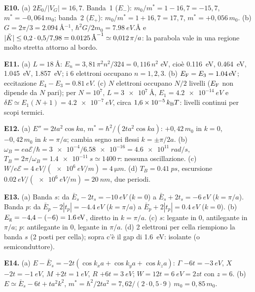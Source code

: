 \documentclass[11pt,a4paper]{article}
\begin{document}
\smallskip\noindent\textbf{E10.} (a) $2E_0/|V_G|=16{,}7$. Banda~1 ($E_-$): $m_0/m^*=1-16{,}7=-15{,}7$, $m^*=-0{,}064\,m_0$; banda~2 ($E_+$): $m_0/m^*=1+16{,}7=17{,}7$, $m^*=+0{,}056\,m_0$. (b) $G=2\pi/3=\SI{2.094}{\angstrom^{-1}}$, $\hbar^2G/2m_0=\SI{7.98}{eV.\angstrom}$ e $|\tilde K|\le0{,}2\cdot0{,}5/7{,}98=\SI{0.0125}{\angstrom^{-1}}\simeq0{,}012\,\pi/a$: la parabola vale in una regione molto stretta attorno al bordo.

\smallskip\noindent\textbf{E11.} (a) $L=\SI{18}{\angstrom}$: $E_n=3{,}81\,\pi^2n^2/324=0{,}116\,n^2$ eV, cioè \SI{0.116}{eV}, \SI{0.464}{eV}, \SI{1.045}{eV}, \SI{1.857}{eV}; i 6 elettroni occupano $n=1,2,3$. (b) $E_{\mathrm F}=E_3=\SI{1.04}{eV}$; eccitazione $E_4-E_3=\SI{0.81}{eV}$. (c) $N$ elettroni occupano $N/2$ livelli ($E_{\mathrm F}$ non dipende da $N$ pari); per $N=10^7$, $L=\SI{3e7}{\angstrom}$, $E_1=\SI{4.2e-14}{eV}$ e $\delta E\simeq E_1(N+1)=\SI{4.2e-7}{eV}$, circa $1{,}6\times10^{-5}\,k_{\mathrm B} T$: livelli continui per scopi termici.

\smallskip\noindent\textbf{E12.} (a) $E''=2ta^2\cos ka$, $m^*=\hbar^2/(2ta^2\cos ka)$: $+0{,}42\,m_0$ in $k=0$, $-0{,}42\,m_0$ in $k=\pi/a$; cambia segno nei flessi $k=\pm\pi/2a$. (b) $\omega_B=ea\mathcal E/\hbar=\num{3e-4}/\num{6.58e-16}=\SI{4.6e11}{rad/s}$, $T_B=2\pi/\omega_B=\SI{1.4e-11}{s}\simeq1400\,\tau$: nessuna oscillazione. (c) $W/e\mathcal E=\SI{4}{eV}/(\SI{e6}{eV/m})=\SI{4}{\micro m}$. (d) $T_B=\SI{0.41}{ps}$, escursione $\SI{0.02}{eV}/(\SI{e6}{eV/m})=\SI{20}{nm}$, due periodi.

\smallskip\noindent\textbf{E13.} (a) Banda $s$: da $\bar E_s-2t_s=\SI{-10}{eV}$ ($k=0$) a $\bar E_s+2t_s=\SI{-6}{eV}$ ($k=\pi/a$). Banda $p$: da $\bar E_p-2|t_p|=\SI{-4.4}{eV}$ ($k=\pi/a$) a $\bar E_p+2|t_p|=\SI{+0.4}{eV}$ ($k=0$). (b) $E_{\mathrm g}=-4{,}4-(-6)=\SI{1.6}{eV}$, diretto in $k=\pi/a$. (c) $s$: legante in $0$, antilegante in $\pi/a$; $p$: antilegante in $0$, legante in $\pi/a$. (d) 2 elettroni per cella riempiono la banda $s$ (2 posti per cella); sopra c'è il gap di \SI{1.6}{eV}: isolante (o semiconduttore).

\smallskip\noindent\textbf{E14.} (a) $E-\bar E_s=-2t(\cos k_xa+\cos k_ya+\cos k_za)$: $\Gamma$ $-6t=\SI{-3}{eV}$, $X$ $-2t=\SI{-1}{eV}$, $M$ $+2t=\SI{+1}{eV}$, $R$ $+6t=\SI{+3}{eV}$; $W=12t=\SI{6}{eV}=2zt$ con $z=6$. (b) $E\simeq\bar E_s-6t+ta^2k^2$, $m^*=\hbar^2/2ta^2=7{,}62/(2\cdot0{,}5\cdot9)\,m_0=0{,}85\,m_0$.

\endgroup
\end{document}
